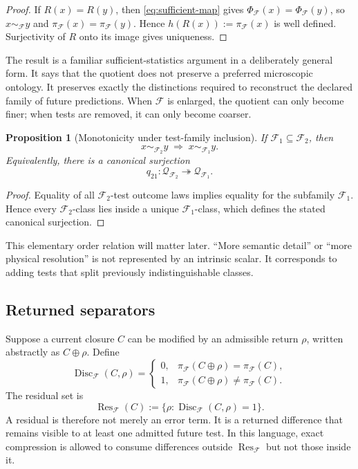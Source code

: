 \documentclass[11pt]{article}
\newtheorem{proposition}[definition]{Proposition}
\newcommand{\F}{\mathcal F}
\newcommand{\Q}{\mathcal Q}
\newcommand{\Res}{\operatorname{Res}}
\newcommand{\Disc}{\operatorname{Disc}}
\begin{document}
\begin{proof}
If $R(x)=R(y)$, then \eqref{eq:sufficient-map} gives $\Phi_{\F}(x)=\Phi_{\F}(y)$, so $x\sim_{\F}y$ and $\pi_{\F}(x)=\pi_{\F}(y)$. Hence $h(R(x)):=\pi_{\F}(x)$ is well defined. Surjectivity of $R$ onto its image gives uniqueness.
\end{proof}

The result is a familiar sufficient-statistics argument in a deliberately general form. It says that the quotient does not preserve a preferred microscopic ontology. It preserves exactly the distinctions required to reconstruct the declared family of future predictions. When $\F$ is enlarged, the quotient can only become finer; when tests are removed, it can only become coarser.

\begin{proposition}[Monotonicity under test-family inclusion]
If $\F_1\subseteq\F_2$, then
\begin{equation}
   x\sim_{\F_2}y \;\Longrightarrow\; x\sim_{\F_1}y.
   \label{eq:monotonicity}
\end{equation}
Equivalently, there is a canonical surjection
\begin{equation}
   q_{21}:\Q_{\F_2}\twoheadrightarrow\Q_{\F_1}.
\end{equation}
\end{proposition}

\begin{proof}
Equality of all $\F_2$-test outcome laws implies equality for the subfamily $\F_1$. Hence every $\F_2$-class lies inside a unique $\F_1$-class, which defines the stated canonical surjection.
\end{proof}

This elementary order relation will matter later. ``More semantic detail'' or ``more physical resolution'' is not represented by an intrinsic scalar. It corresponds to adding tests that split previously indistinguishable classes.

\subsection{Returned separators}

Suppose a current closure $C$ can be modified by an admissible return $\rho$, written abstractly as $C\oplus\rho$. Define
\begin{equation}
  \Disc_{\F}(C,\rho)
  =
  \begin{cases}
  0,& \pi_{\F}(C\oplus\rho)=\pi_{\F}(C),\\
  1,& \pi_{\F}(C\oplus\rho)\neq\pi_{\F}(C).
  \end{cases}
  \label{eq:disc}
\end{equation}
The residual set is
\begin{equation}
  \Res_{\F}(C)
  :=
  \{\rho:\Disc_{\F}(C,\rho)=1\}.
  \label{eq:residual}
\end{equation}
A residual is therefore not merely an error term. It is a returned difference that remains visible to at least one admitted future test. In this language, exact compression is allowed to consume differences outside $\Res_{\F}$ but not those inside it.
\end{document}
